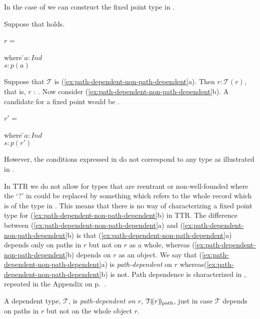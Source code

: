 \begin{shaded}
\begin{ex}
\begin{subex}
\end{subex} 
\label{ex:path-dependent-non-path-dependent}   
\end{ex} 
In the case of  we can construct the fixed point type in
\nexteg{}.
\begin{ex} 
\end{ex} 
Suppose that \nexteg{} holds.
\begin{ex} 
  $r$ = 

\begin{tabbing}
  where \=$a:\textit{Ind}$\\
  \>$s:p(a)$
\end{tabbing}

\end{ex} 
Suppose that $\mathcal{T}$ is
(\ref{ex:path-dependent-non-path-dependent}a).  Then
$r:\mathcal{T}(r)$, that is, $r$ :
.  Now consider
(\ref{ex:path-dependent-non-path-dependent}b).  A candidate for a
fixed point would be \nexteg{}.
\begin{ex} 
  $r'$ = 

\begin{tabbing}
  where \=$a:\textit{Ind}$\\
  \>$s:p(r')$
\end{tabbing}

\end{ex}
However, the conditions expressed in \preveg{} do not correspond to
any type as illustrated in \nexteg{}.
\begin{ex} 
\end{ex}
In TTR we do not allow for types that are reentrant or
non-well-founded where the `?' in \preveg{} could be replaced by
something which refers to the whole record which is of the type in
\preveg{}.  This means that there is no way of characterizing a fixed
point type for (\ref{ex:path-dependent-non-path-dependent}b) in TTR.
The difference between (\ref{ex:path-dependent-non-path-dependent}a)
and (\ref{ex:path-dependent-non-path-dependent}b) is that
(\ref{ex:path-dependent-non-path-dependent}a) depends only on paths in
$r$ but not on $r$ as a whole, whereas
(\ref{ex:path-dependent-non-path-dependent}b) depends on $r$ as an
object.  We say that (\ref{ex:path-dependent-non-path-dependent}a) is
\textit{path-dependent} on $r$
whereas(\ref{ex:path-dependent-non-path-dependent}b) is not.  Path
dependence is characterized in \nexteg{}, repeated in the
Appendix on p.~\pageref{pg:fixedpointtype}.
\begin{ex} 
A dependent type, $\mathcal{T}$, is \textit{path-dependent on $r$},
$\mathcal{T}(\!(r)\!)_{\text{path}}$, just in case $\mathcal{T}$ depends
on paths in $r$ but not on the whole object $r$. 
\end{ex}


\end{shaded}
